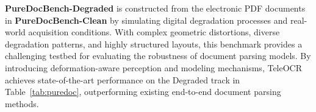 \documentclass{fairmeta}
\begin{document}
\textbf{PureDocBench-Degraded} is constructed from the electronic PDF documents in \textbf{PureDocBench-Clean} by simulating digital degradation processes and real-world acquisition conditions. With complex geometric distortions, diverse degradation patterns, and highly structured layouts, this benchmark provides a challenging testbed for evaluating the robustness of document parsing models. By introducing deformation-aware perception and modeling mechanisms, TeleOCR achieves state-of-the-art performance on the Degraded track in Table~\ref{tab:puredoc}, outperforming existing end-to-end document parsing methods.


\begin{table}[h]
  \centering
\caption{Performance comparison of document parsing methods on Wild OmniDocBench~v1.5 Full for camera-captured document parsing across text, formula, table, and reading order extraction.}
\end{table}
\end{document}
